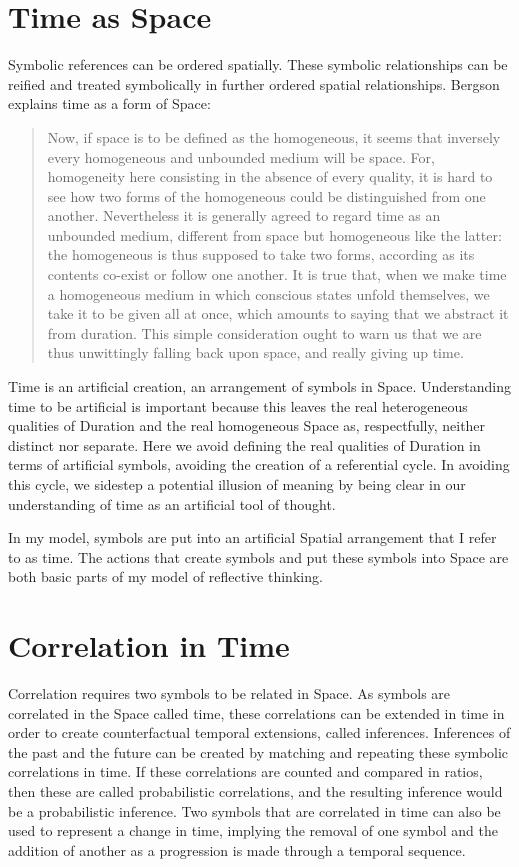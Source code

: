 \section{Time as Space}

Symbolic references can be ordered spatially.  These symbolic
relationships can be reified and treated symbolically in further
ordered spatial relationships.  Bergson explains time as a form of
Space:

\begin{quote}
Now, if space is to be defined as the homogeneous, it seems that
inversely every homogeneous and unbounded medium will be space.  For,
homogeneity here consisting in the absence of every quality, it is
hard to see how two forms of the homogeneous could be distinguished
from one another.  Nevertheless it is generally agreed to regard time
as an unbounded medium, different from space but homogeneous like the
latter: the homogeneous is thus supposed to take two forms, according
as its contents co-exist or follow one another.  It is true that, when
we make time a homogeneous medium in which conscious states unfold
themselves, we take it to be given all at once, which amounts to
saying that we abstract it from duration.  This simple consideration
ought to warn us that we are thus unwittingly falling back upon space,
and really giving up time.
\end{quote}

Time is an artificial creation, an arrangement of symbols in Space.
Understanding time to be artificial is important because this leaves
the real heterogeneous qualities of Duration and the real homogeneous
Space as, respectfully, neither distinct nor separate.  Here we avoid
defining the real qualities of Duration in terms of artificial
symbols, avoiding the creation of a referential cycle.  In avoiding
this cycle, we sidestep a potential illusion of meaning by being clear
in our understanding of time as an artificial tool of thought.

In my model, symbols are put into an artificial Spatial arrangement
that I refer to as time.  The actions that create symbols and put
these symbols into Space are both basic parts of my model of
reflective thinking.

\section{Correlation in Time}

Correlation requires two symbols to be related in Space.  As symbols
are correlated in the Space called time, these correlations can be
extended in time in order to create counterfactual temporal
extensions, called inferences.  Inferences of the past and the future
can be created by matching and repeating these symbolic correlations
in time.  If these correlations are counted and compared in ratios,
then these are called probabilistic correlations, and the resulting
inference would be a probabilistic inference.  Two symbols that are
correlated in time can also be used to represent a change in time,
implying the removal of one symbol and the addition of another as a
progression is made through a temporal sequence.

